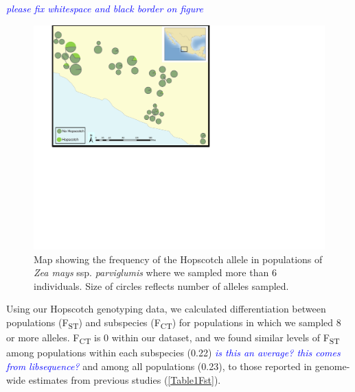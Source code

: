 \documentclass[12pt]{article}
\newcommand{\jri}[1]{\textcolor{blue}{ \emph{\scriptsize  #1}} }
\begin{document}
\jri{please fix whitespace and black border on figure}
\begin{figure}[!t]
  \begin{center}
   \includegraphics[width=250mm]{Fig1Map.pdf}
    \caption{Map showing the frequency of the Hopscotch allele in populations of \emph{Zea mays} ssp. \emph{parviglumis} where we sampled more than 6 individuals. Size of circles reflects number of alleles sampled. } 
\label{Fig1Map}
  \end{center}
\end{figure}

Using our Hopscotch genotyping data, we calculated differentiation between populations (F\textsubscript{ST}) and subspecies (F\textsubscript{CT}) for populations in which we sampled 8 or more alleles. F\textsubscript{CT} is 0 within our dataset, and we found similar levels of F\textsubscript{ST} among populations within each subspecies (0.22) \jri{is this an average? this comes from libsequence?} and among all populations (0.23), to those reported in genome-wide estimates from previous studies \cite{Pyhajarvi2013} (\ref{Table1Fst}). 
\end{document}
